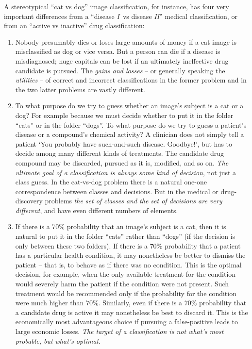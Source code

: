 \documentclass[a4paper,12pt,%
onecolumn,oneside,article,%
british%
]{memoir}
\newcommand*{\pencil}{{\fontencoding{U}\fontfamily{fontawesometwo}\selectfont\symbol{210}}}
\newcommand{\mynotep}[1]{{\footnotesize\color{notecolour}\pencil\ #1}}
\renewcommand*{\|}[1][]{\nonscript\:#1\vert\nonscript\:\mathopen{}}
\newcommand*{\tI}{\textit{I}}
\newcommand*{\tII}{\textit{II}}
\begin{document}
A stereotypical \enquote{cat vs dog} image classification, for instance, has four very important differences from a \enquote{disease \tI\ vs disease \tII} medical classification, or from an \enquote{active vs inactive} drug classification:
\begin{enumerate}[label=(\roman*)]

\item\label{item:gain_loss}Nobody presumably dies or loses large amounts of money if a cat image is misclassified as dog or vice versa. But a person can die if a disease is misdiagnosed; huge capitals can be lost if an ultimately ineffective drug candidate is pursued. The \emph{gains and losses} -- or generally speaking the \emph{utilities} -- of correct and incorrect classifications in the former problem and in the two latter problems are vastly different.

\item\label{item:decisions_classes} To what purpose do we try to guess whether an image's subject is a cat or a dog? For example because we must decide whether to put it in the folder \enquote{cats} or in the folder \enquote{dogs}. To what purpose do we try to guess a patient's disease or a compound's chemical activity? A clinician does not simply tell a patient \enquote*{You probably have such-and-such disease. Goodbye!}, but has to decide among many different kinds of treatments. The candidate drug compound may be discarded, pursued as it is, modified, and so on. \emph{The ultimate goal of a classification is always some kind of decision}, not just a class guess. In the cat-vs-dog problem there is a natural one-one correspondence between classes and decisions. But in the medical or drug-discovery problems \emph{the set of classes and the set of decisions are very different}, and have even different numbers of elements.

\item\label{item:optimal_truth} If there is a 70\% probability that an image's subject is a cat, then it is natural to put it in the folder \enquote{cats} rather than \enquote{dogs} (if the decision is only between these two folders). If there is a 70\% probability that a patient has a particular health condition, it may nonetheless be better to dismiss the patient -- that is, to behave as if there was no condition. This is the optimal decision, for example, when the only available treatment for the condition would severely harm the patient if the condition were not present. Such treatment would be recommended only if the probability for the condition were much higher than 70\%. Similarly, even if there is a 70\% probability that a candidate drug is active it may nonetheless be best to discard it. This is the economically most advantageous choice if pursuing a false-positive leads to large economic losses. \emph{The target of a classification is not what’s most probable, but what’s optimal.}


\end{enumerate}
\end{document}
